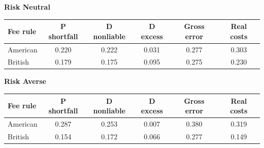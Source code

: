 \documentclass[10pt,border=5pt,varwidth=17cm]{standalone}
\begin{document}
\begingroup
\small
\setlength{\tabcolsep}{5pt}
\renewcommand{\arraystretch}{1.20}
\noindent\textbf{Risk Neutral}\par\smallskip
\noindent\begin{tabularx}{\linewidth}{@{}>{\raggedright\arraybackslash}Xccccc@{}}
\toprule
\textbf{Fee rule} & \textbf{P shortfall} & \textbf{D nonliable} & \textbf{D excess} & \textbf{Gross error} & \textbf{Real costs} \\
\midrule
American & 0.220 & 0.222 & 0.031 & 0.277 & 0.303 \\
British & 0.179 & 0.175 & 0.095 & 0.275 & 0.230 \\
\bottomrule\end{tabularx}\par\medskip
\noindent\textbf{Risk Averse}\par\smallskip
\noindent\begin{tabularx}{\linewidth}{@{}>{\raggedright\arraybackslash}Xccccc@{}}
\toprule
\textbf{Fee rule} & \textbf{P shortfall} & \textbf{D nonliable} & \textbf{D excess} & \textbf{Gross error} & \textbf{Real costs} \\
\midrule
American & 0.287 & 0.253 & 0.007 & 0.380 & 0.319 \\
British & 0.154 & 0.172 & 0.066 & 0.277 & 0.149 \\
\bottomrule\end{tabularx}\par\medskip
\endgroup
\end{document}
